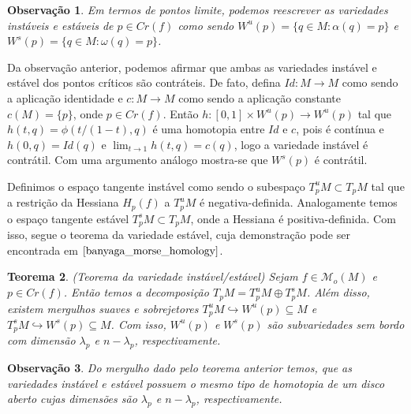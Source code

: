 \documentclass[12pt]{book}
\newtheorem{teorema}{Teorema}[section]
\newtheorem{observacao}[teorema]{Observação}
\newcommand{\espacotangentevariedadeestavel}{T^{s}_{p}M}
\newcommand{\espacotangentevariedadeinstavel}{T^{u}_{p}M}
\newcommand{\espacotangenteponto}[2]{T_{#1}#2}
\newcommand{\espacotangentevariedade}{\espacotangenteponto{p}{M}}
\newcommand{\funcoesmorse}[1]{\mathcal{M}_{o}(#1)}
\newcommand{\hessiana}{H_{p}(f)}
\newcommand{\intervalo}{[0,1]}
\newcommand{\pontoscriticos}[1]{\textit{Cr}(#1)}
\newcommand{\variedadeestavel}[1]{W^{s}(#1)}
\newcommand{\variedadeinstavel}[1]{W^{u}(#1)}
\begin{document}
	\begin{observacao}
		Em termos de pontos limite, podemos reescrever as variedades instáveis e estáveis de $p \in \pontoscriticos{f}$ como sendo $\variedadeinstavel{p} = \{q\in M: \alpha(q)=p\}$ e $\variedadeestavel{p} = \{q\in M: \omega(q)=p\}$.
	\end{observacao}
	
	Da observação anterior, podemos afirmar que ambas as variedades instável e estável dos pontos críticos são contráteis. De fato, defina $Id: M\to M$ como sendo a aplicação identidade e $c:M\to M$ como sendo a aplicação constante $c(M) =\{p\} $, onde $p \in \pontoscriticos{f}$. Então $h:\intervalo\times \variedadeinstavel{p} \to \variedadeinstavel{p}$ tal que $h(t,q) = \phi(t/(1-t), q)$ é uma homotopia entre $Id$ e $c$, pois é contínua e $h(0, q) = Id(q)$ e $\lim_{t \to 1}h(t, q) = c(q)$, logo a variedade instável é contrátil. Com uma argumento análogo mostra-se que $\variedadeestavel{p}$ é contrátil.
	
	Definimos o espaço tangente instável como sendo o subespaço $\espacotangentevariedadeinstavel\subset \espacotangentevariedade$ tal que a restrição da Hessiana $\hessiana$ a $\espacotangentevariedadeinstavel$ é negativa-definida. Analogamente temos o espaço tangente estável $\espacotangentevariedadeestavel \subset \espacotangentevariedade$, onde a Hessiana é positiva-definida. Com isso, segue o teorema da variedade estável, cuja demonstração pode ser encontrada em $\cite{banyaga_morse_homology}$.
	
	\begin{teorema}\label{teorema_variedade_instavel_estavel}
		(Teorema da variedade instável/estável) Sejam $f \in \funcoesmorse{M}$ e $p \in \pontoscriticos{f}$. Então temos a decomposição $\espacotangentevariedade=\espacotangentevariedadeinstavel\oplus\espacotangentevariedadeestavel$. Além disso, existem mergulhos suaves e sobrejetores $\espacotangentevariedadeinstavel \hookrightarrow \variedadeinstavel{p} \subseteq M$ e $\espacotangentevariedadeestavel \hookrightarrow \variedadeestavel{p} \subseteq M$. Com isso, $\variedadeinstavel{p}$ e $\variedadeestavel{p}$ são subvariedades sem bordo com dimensão $\lambda_{p}$ e $n-\lambda_{p}$, respectivamente.
	\end{teorema}
	
	\begin{observacao}
		Do mergulho dado pelo teorema anterior temos, que as variedades instável e estável possuem o mesmo tipo de homotopia de um disco aberto cujas dimensões são $\lambda_{p}$ e $n-\lambda_{p}$, respectivamente.
	\end{observacao}
\end{document}

